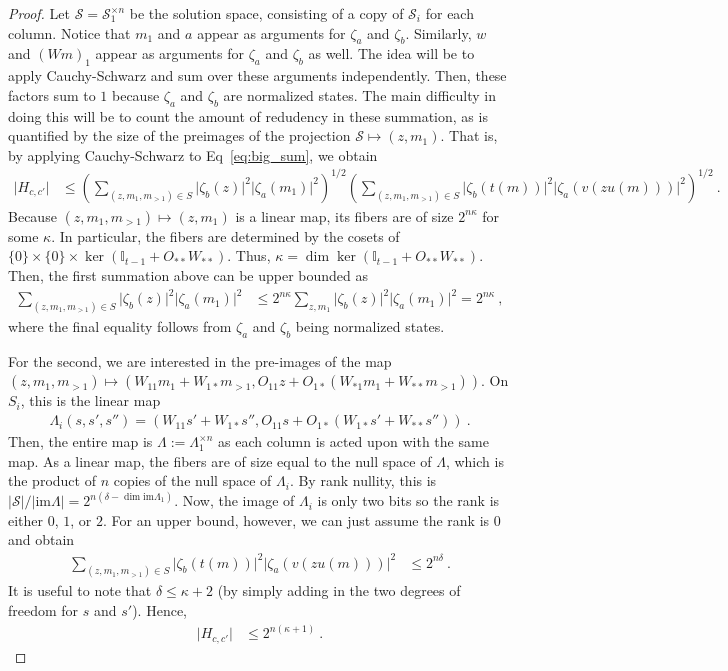 \documentclass[11pt]{article}
\newcommand{\id}{\ensuremath{\mathbb{I}}}
\begin{document}
\begin{proof}
    Let $\mathcal{S} = \mathcal{S}_1^{\times n}$ be the solution space, consisting of a copy of $\mathcal{S}_i$ for each column. Notice that $m_1$ and $a$ appear as arguments for $\zeta_a$ and $\zeta_b$. Similarly, $w$ and $(Wm)_1$ appear as arguments for $\zeta_a$ and $\zeta_b$ as well. The idea will be to apply Cauchy-Schwarz and sum over these arguments independently. Then, these factors sum to $1$ because $\zeta_a$ and $\zeta_b$ are normalized states. The main difficulty in doing this will be to count the amount of redudency in these summation, as is quantified by the size of the preimages of the projection $\mathcal{S} \mapsto (z,m_1)$. That is, by applying Cauchy-Schwarz to Eq~\eqref{eq:big_sum}, we obtain
    \begin{align}
        \vert H_{c,c'}\vert & \leq \left( \sum_{(z,m_1,m_{>1})\in S} \vert \zeta_b(z)\vert^2 \vert  \zeta_a(m_1)\vert^2 \right)^{1/2} \left( \sum_{(z,m_1,m_{>1})\in S} \vert \zeta_b(t(m)) \vert^2 \vert  \zeta_a(v(zu(m)))\vert^2 \right)^{1/2}\ .
    \end{align}
    Because $(z,m_1,m_{>1})\mapsto (z,m_1)$ is a linear map, its fibers are of size $2^{n\kappa}$ for some $\kappa$. In particular, the fibers are determined by the cosets of $\{0\}\times \{0\}\times \ker(\id_{t-1}+O_{**}W_{**})$. Thus, $\kappa = \dim \ker(\id_{t-1}+O_{**}W_{**})$. Then, the first summation above can be upper bounded as
    \begin{align}
         \sum_{(z,m_1,m_{>1})\in S} \vert \zeta_b(z)\vert^2 \vert  \zeta_a(m_1)\vert^2  & \leq 2^{n\kappa} \sum_{z,m_1} \vert \zeta_b(z)\vert^2 \vert  \zeta_a(m_1)\vert^2 = 2^{n\kappa}\ ,
    \end{align}
    where the final equality follows from $\zeta_a$ and $\zeta_b$ being normalized states.

    For the second, we are interested in the pre-images of the map $(z,m_1,m_{>1}) \mapsto (W_{11}m_1+W_{1*}m_{>1}, O_{11}z+O_{1*}(W_{*1}m_1+W_{**}m_{>1}))$. On $S_i$, this is the linear map
    \begin{align}
        \Lambda_i(s,s',s'') =  (W_{11}s'+W_{1*}s'', O_{11}s+O_{1*}(W_{1*}s'+W_{**}s''))\ .
    \end{align}
    Then, the entire map is $\Lambda := \Lambda_1^{\times n}$ as each column is acted upon with the same map. As a linear map, the fibers are of size equal to the null space of $\Lambda$, which is the product of $n$ copies of the null space of $\Lambda_i$. By rank nullity, this is $\vert \mathcal{S}\vert / \vert \text{im} \Lambda \vert = 2^{n(\delta-\dim\text{im}\Lambda_1)}$. Now, the image of $\Lambda_i$ is only two bits so the rank is either $0$, $1$, or $2$. For an upper bound, however, we can just assume the rank is $0$ and obtain
    \begin{align}
         \sum_{(z,m_1,m_{>1})\in S} \vert \zeta_b(t(m)) \vert^2 \vert  \zeta_a(v(zu(m)))\vert^2  & \leq 2^{n\delta}\ .
    \end{align}
    It is useful to note that $\delta \leq \kappa +2$ (by simply adding in the two degrees of freedom for $s$ and $s'$). Hence, 
    \begin{align}
        \vert H_{c,c'}\vert & \leq 2^{n(\kappa+1)}\ .
    \end{align}


\end{proof}
\end{document}
